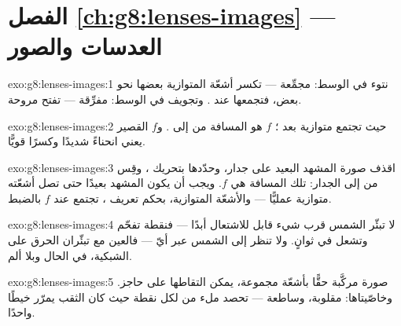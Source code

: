 \section*{الفصل \ref{ch:g8:lenses-images} --- العدسات والصور}

\begin{solution}{exo:g8:lenses-images:1}
نتوء في الوسط: مجمِّعة --- تكسر أشعّة  المتوازية بعضها
نحو بعض، فتجمعها عند . وتجويف في الوسط: مفرِّقة ---
تفتح  مروحة.
\end{solution}

\begin{solution}{exo:g8:lenses-images:2}
 حيث تجتمع  متوازية بعد ؛  $f$
هو المسافة من  إلى . و$f$ القصير يعني انحناءً
شديدًا وكسرًا قويًّا.
\end{solution}

\begin{solution}{exo:g8:lenses-images:3}
اقذف صورة المشهد البعيد على جدار، وحدّدها بتحريك ، وقِس
من  إلى الجدار: تلك المسافة هي $f$. ويجب أن يكون المشهد
بعيدًا حتى تصل أشعّته متوازية عمليًّا --- والأشعّة المتوازية،
بحكم تعريف ، تجتمع عند $f$ بالضبط.
\end{solution}

\begin{solution}{exo:g8:lenses-images:4}
لا تبئّر  الشمس قرب شيء قابل للاشتعال أبدًا --- فنقطة
 تفحّم وتشعل في ثوانٍ. ولا تنظر إلى الشمس عبر أيّ 
--- فالعين مع  تبئّران الحرق على الشبكية، في الحال وبلا
ألم.
\end{solution}

\begin{solution}{exo:g8:lenses-images:5}
صورة مركَّبة حقًّا بأشعّة مجموعة، يمكن التقاطها على حاجز.
وخاصّيتاها: مقلوبة، وساطعة ---  تحصد ملء  من 
لكل نقطة حيث كان الثقب يمرّر خيطًا واحدًا.
\end{solution}

